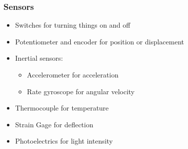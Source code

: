 \documentclass[11pt]{article}
\begin{document}
 \newpage
\subsubsection{Sensors}
\label{sec:org68168a4}
\begin{itemize}
\item Switches for turning things on and off
\item Potentiometer and encoder for position or displacement
\item Inertial sensors:
\begin{itemize}
\item Accelerometer for acceleration
\item Rate gyroscope for angular velocity
\end{itemize}
\item Thermocouple for temperature
\item Strain Gage for deflection
\item Photoelectrics for light intensity
\end{itemize}

 \newpage
\end{document}
